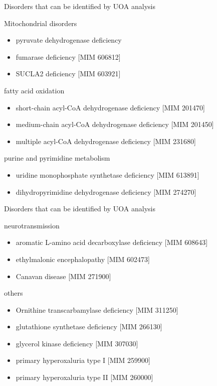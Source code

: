 \documentclass[presentation, smaller]{beamer}
\begin{document}
\begin{frame}[label={sec:org64344ae}]{Disorders that can be identified by UOA analysis}
\begin{block}{Mitochondrial disorders}
\begin{itemize}
\item pyruvate dehydrogenase deficiency
\item fumarase deficiency [MIM 606812]
\item SUCLA2 deficiency [MIM 603921]
\end{itemize}
\end{block}
\begin{block}{fatty acid oxidation}
\begin{itemize}
\item short-chain acyl-CoA dehydrogenase deficiency [MIM 201470]
\item medium-chain acyl-CoA dehydrogenase deficiency [MIM 201450]
\item multiple acyl-CoA dehydrogenase deficiency [MIM 231680]
\end{itemize}
\end{block}

\begin{block}{purine and pyrimidine metabolism}
\begin{itemize}
\item uridine monophosphate synthetase deficiency [MIM 613891]
\item dihydropyrimidine dehydrogenase deficiency [MIM 274270]
\end{itemize}
\end{block}
\end{frame}

\begin{frame}[label={sec:org3bb80fd}]{Disorders that can be identified by UOA analysis}
\begin{block}{neurotransmission}
\begin{itemize}
\item aromatic L-amino acid decarboxylase deficiency [MIM 608643]
\item ethylmalonic encephalopathy [MIM 602473]
\item Canavan disease [MIM 271900]
\end{itemize}
\end{block}
\begin{block}{others}
\begin{itemize}
\item Ornithine transcarbamylase deficiency [MIM 311250]
\item glutathione synthetase deficiency [MIM 266130]
\item glycerol kinase deficiency [MIM 307030]
\item primary hyperoxaluria type I [MIM 259900]
\item primary hyperoxaluria type II [MIM 260000]
\end{itemize}
\end{block}
\end{frame}
\end{document}
